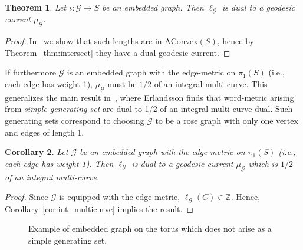 \documentclass[11pt]{amsart}
\newcommand*{\svgfignormal}[1]{\fontsize{9pt}{9pt}\selectfont}
\numberwithin{equation}{section}
\numberwithin{figure}{section}
\newtheorem{theorem}{Theorem}[section]
\newtheorem{corollary}[theorem]{Corollary}
\theoremstyle{definition}
\theoremstyle{plain}
\newcommand{\AConvex}{\mathrm{AConvex}}
\begin{document}
\begin{theorem}
Let $\iota \colon \mathcal{G} \to S$ be an embedded graph. Then $\ell_{\mathcal{G}}$ is dual to a geodesic current $\mu_{\mathcal{G} }$.
\label{thm:dual_embeddedgraph}
\end{theorem}
\begin{proof}
In~\cite[4.4]{MGT21:Smoothings} we show that such lengths are in $\AConvex(S)$, hence by Theorem~\ref{thm:intersect} they have a dual geodesic current. 
\end{proof}

If furthermore $\mathcal{G}$ is an embedded graph with the edge-metric on $\pi_1(S)$ (i.e., each edge has weight 1), $\mu_{\mathcal{G}}$ must be $1/2$ of an integral multi-curve. This generalizes the main result in~\cite{Erlandsson:WordLength}, where Erlandsson finds that word-metric arising from \emph{simple generating set} are dual to 1/2 of an integral multi-curve dual. Such generating sets correspond to choosing $\mathcal{G}$ to be a rose graph with only one vertex and edges of length 1.

\begin{corollary}
Let $\mathcal{G}$ be an embedded graph with the edge-metric on $\pi_1(S)$ (i.e., each edge has weight 1). Then $\ell_{\mathcal{G}}$ is dual to a geodesic current $\mu_{\mathcal{G}}$ which is $1/2$ of an integral multi-curve.
\label{cor:generalization_wordlength}
\end{corollary}
\begin{proof}
Since $\mathcal{G}$ is equipped with the edge-metric, $\ell_{\mathcal{G}}(C) \in \mathbb{Z}$.
Hence, Corollary~\ref{cor:int_multicurve} implies the result.
\end{proof}

\begin{figure}
\centering{
\svgfignormal{embedded}}
\caption{Example of embedded graph on the torus which does not arise as a simple generating set.}
  \label{fig:embedded-graph}
\end{figure}
\end{document}
